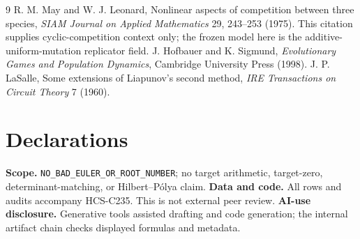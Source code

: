 \documentclass[10pt]{article}
\begin{document}
\begin{thebibliography}{9}
 R. M. May and W. J. Leonard, Nonlinear aspects of
competition between three species, \emph{SIAM Journal on Applied Mathematics}
29, 243--253 (1975).  This citation supplies cyclic-competition context only;
the frozen model here is the additive-uniform-mutation replicator field.
 J. Hofbauer and K. Sigmund, \emph{Evolutionary Games and
Population Dynamics}, Cambridge University Press (1998).
 J. P. LaSalle, Some extensions of Liapunov's second method,
\emph{IRE Transactions on Circuit Theory} 7 (1960).
\end{thebibliography}

\section*{Declarations}
\textbf{Scope.} \texttt{NO\_BAD\_EULER\_OR\_ROOT\_NUMBER}; no target
arithmetic, target-zero, determinant-matching, or Hilbert--Pólya claim.
\textbf{Data and code.} All rows and audits accompany HCS-C235.  This is not
external peer review.
\textbf{AI-use disclosure.} Generative tools assisted drafting and code
generation; the internal artifact chain checks displayed formulas and metadata.
\end{document}
